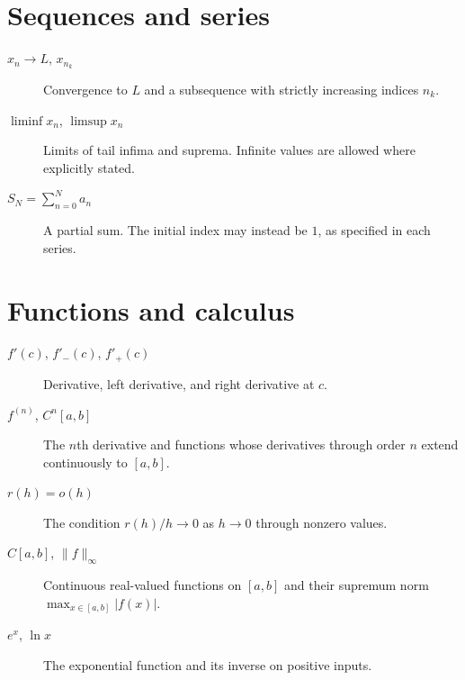 \section{Sequences and series}
\begin{description}
  \item[$x_n\to L$, $x_{n_k}$] Convergence to $L$ and a subsequence with
    strictly increasing indices $n_k$.
  \item[$\liminf x_n$, $\limsup x_n$] Limits of tail infima and suprema.
    Infinite values are allowed where explicitly stated.
  \item[$S_N=\sum_{n=0}^N a_n$] A partial sum. The initial index may
    instead be $1$, as specified in each series.
\end{description}

\section{Functions and calculus}
\begin{description}
  \item[$f'(c)$, $f'_-(c)$, $f'_+(c)$] Derivative, left derivative, and
    right derivative at $c$.
  \item[{$f^{(n)}$, $C^n[a,b]$}] The $n$th derivative and functions whose
    derivatives through order $n$ extend continuously to $[a,b]$.
  \item[$r(h)=o(h)$] The condition $r(h)/h\to0$ as $h\to0$ through
    nonzero values.
  \item[{$C[a,b]$, $\|f\|_\infty$}] Continuous real-valued functions on
    $[a,b]$ and their supremum norm $\max_{x\in[a,b]}|f(x)|$.
  \item[$e^x$, $\ln x$] The exponential function and its inverse on
    positive inputs.
\end{description}
